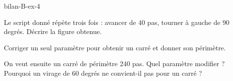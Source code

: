 \begin{blocEdition}{bilan-B-ex-4}
\begin{questions}
\item Le script donné répète trois fois : avancer de 40 pas, tourner à gauche de 90 degrés. Décrire la figure obtenue.
\item Corriger un seul paramètre pour obtenir un carré et donner son périmètre.
\item On veut ensuite un carré de périmètre 240 pas. Quel paramètre modifier ? Pourquoi un virage de 60 degrés ne convient-il pas pour un carré ?
\end{questions}\label{fig-bilan-B-ex-4}
\par{}\par\par{}\par{}\par{}\par{}\par{}\par{}
\end{blocEdition}
